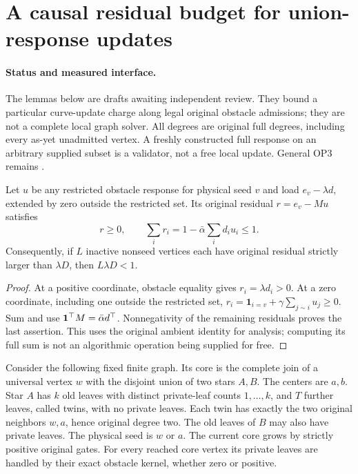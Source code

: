 \section[Residual-paid union updates]{A causal residual budget for union-response updates}
\label{sec:op3-module-admission-budget}

\paragraph{Status and measured interface.}
The lemmas below are \statusproved{} drafts awaiting independent review.
They bound a particular curve-update charge along legal original obstacle
admissions; they are not a complete local graph solver. All degrees are
original full degrees, including every as-yet unadmitted vertex. A freshly
constructed full response on an arbitrary supplied subset is a validator,
not a free local update. General OP3 remains \statusopen.

\begin{lemma}
\label{lem:op3-inactive-residual-mass}
Let $u$ be any restricted obstacle response for physical seed $v$ and
load $e_v-\lambda d$, extended by zero outside the restricted set. Its
original residual $r=e_v-Mu$ satisfies
\begin{equation}
 r\geq0,\qquad \sum_i r_i
   =1-\bar\alpha\sum_i d_i u_i\leq1.
 \label{eq:op3-inactive-residual-mass}
\end{equation}
Consequently, if $L$ inactive nonseed vertices each have original residual
strictly larger than $\lambda D$, then $L\lambda D<1$.
\end{lemma}
\begin{proof}
At a positive coordinate, obstacle equality gives $r_i=\lambda d_i>0$.
At a zero coordinate, including one outside the restricted set,
$r_i=\mathbf1_{i=v}+\gamma\sum_{j\sim i}u_j\geq0$.
Sum and use $\mathbf{1}^\top M=\bar\alpha d^\top$. Nonnegativity of the
remaining residuals proves the last assertion. This uses the original
ambient identity for analysis; computing its full sum is not an algorithmic
operation being supplied for free.
\end{proof}

Consider the following fixed finite graph. Its core is the complete join
of a universal vertex $w$ with the disjoint union of two stars $A,B$.
The centers are $a,b$. Star $A$ has $k$ old leaves with distinct private-leaf
counts $1,\ldots,k$, and $T$ further leaves, called twins, with no private
leaves. Each twin has exactly the two original neighbors $w,a$, hence
original degree two. The old leaves of $B$ may also have private leaves.
The physical seed is $w$ or $a$. The current core grows by strictly positive
original gates. For every reached core vertex its private leaves are
handled by their exact obstacle kernel, whether zero or positive.

